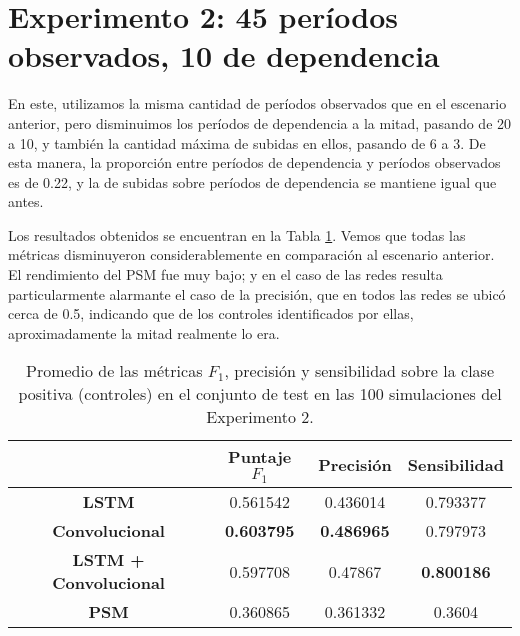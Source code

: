 \documentclass[../../main.tex]{subfiles}
\begin{document}
\section{Experimento 2: 45 períodos observados, 10 de dependencia}
En este, utilizamos la misma cantidad de períodos observados que en el escenario anterior,
pero disminuimos los períodos de dependencia a la mitad, pasando de 20 a 10, y también la
cantidad máxima de subidas en ellos, pasando de 6 a 3. De esta manera, la proporción entre
períodos de dependencia y períodos observados es de 0.22, y la de subidas sobre períodos
de dependencia se mantiene igual que antes.


Los resultados obtenidos se encuentran en la Tabla \ref{tab:results_exp2}. Vemos que todas
las métricas disminuyeron considerablemente en comparación al escenario anterior. El
rendimiento del PSM fue muy bajo; y en el caso de las redes resulta particularmente
alarmante el caso de la precisión, que en todos las redes se ubicó cerca de 0.5, indicando
que de los controles identificados por ellas, aproximadamente la mitad realmente lo era.

\begin{table}[H]
    \centering
    \renewcommand{\arraystretch}{1.2}
    \begin{tabular}{|c|c|c|c|}
        \hline
         & \textbf{Puntaje} \(F_1\) & \textbf{Precisión} & \textbf{Sensibilidad} \\ \hline\hline
        \textbf{LSTM}
            & 0.561542 & 0.436014 & 0.793377 \\ \hline
        \textbf{Convolucional}
            & \textbf{0.603795} & \textbf{0.486965} & 0.797973 \\ \hline
        \textbf{LSTM + Convolucional}
            & 0.597708 & 0.47867 & \textbf{0.800186} \\ \hline
        \textbf{PSM}
            & 0.360865 & 0.361332 & 0.3604 \\
        \hline
    \end{tabular}
    \caption{Promedio de las métricas \(F_1\), precisión y sensibilidad sobre la
    clase positiva (controles) en el conjunto de test en las 100 simulaciones del
    Experimento 2.}
    \label{tab:results_exp2}
\end{table}
\end{document}
